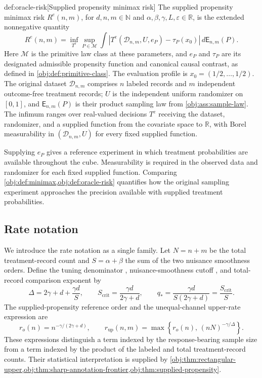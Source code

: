 \documentclass[11pt]{article}
\begin{document}
\begin{definitionv}{def:oracle-risk}[Supplied propensity minimax risk]
The supplied propensity minimax risk \(R^e(n,m)\), for \(d,n,m\in\mathbb N\) and \(\alpha,\beta,\gamma,L,\varepsilon\in\mathbb R\), is the extended nonnegative quantity
\[
R^e(n,m)=\inf_{T^e}\sup_{P\in\mathcal M}
\int
\left|T^e(\mathcal D_{n,m},U,e_P)-\tau_P(x_0)\right|
\,d\mathsf E_{n,m}(P).
\]
Here \(\mathcal M\) is the primitive law class at these parameters, and \(e_P\) and \(\tau_P\) are its designated admissible propensity function and canonical causal contrast, as defined in \cref{obj:def:primitive-class}. The evaluation profile is \(x_0=(1/2,\ldots,1/2)\). The original dataset \(\mathcal D_{n,m}\) comprises \(n\) labeled records and \(m\) independent outcome-free treatment records; \(U\) is the independent uniform randomizer on \([0,1]\), and \(\mathsf E_{n,m}(P)\) is their product sampling law from \cref{obj:ass:sample-law}. The infimum ranges over real-valued decisions \(T^e\) receiving the dataset, randomizer, and a supplied function from the covariate space to \(\mathbb R\), with Borel measurability in \((\mathcal D_{n,m},U)\) for every fixed supplied function.
\end{definitionv}

Supplying \(e_P\) gives a reference experiment in which treatment probabilities are available throughout the cube. Measurability is required in the observed data and randomizer for each fixed supplied function. Comparing \cref{obj:def:minimax,obj:def:oracle-risk} quantifies how the original sampling experiment approaches the precision available with supplied treatment probabilities.

\subsection{Rate notation}

We introduce the rate notation as a single family. Let \(N=n+m\) be the total treatment-record count and \(S=\alpha+\beta\) the sum of the two nuisance smoothness orders. Define the tuning denominator , nuisance-smoothness cutoff , and total-record comparison exponent  by
\[
\Delta=2\gamma+d+\frac{\gamma d}{S},
\qquad
S_{\mathrm{crit}}=\frac{\gamma d}{2\gamma+d},
\qquad
q_*=\frac{\gamma d}{S(2\gamma+d)}
=\frac{S_{\mathrm{crit}}}{S}.
\]
The supplied-propensity reference order  and the unequal-channel upper-rate expression  are
\[
r_o(n)=n^{-\gamma/(2\gamma+d)},
\qquad
r_{\mathrm{up}}(n,m)
=
\max\left\{
r_o(n),\,
(nN)^{-\gamma/\Delta}
\right\}.
\]
These expressions distinguish a term indexed by the response-bearing sample size from a term indexed by the product of the labeled and total treatment-record counts. Their statistical interpretation is supplied by \cref{obj:thm:rectangular-upper,obj:thm:sharp-annotation-frontier,obj:thm:supplied-propensity}.
\end{document}
